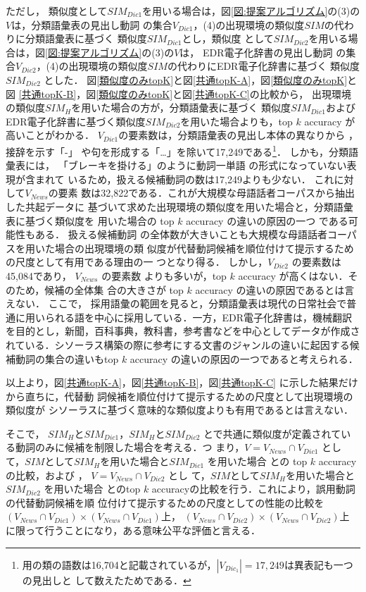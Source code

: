 \documentclass[japanese]{jnlp_1.4}
\begin{document}
ただし，
類似度として$SIM_{Dic1}$を用いる場合は，図\ref{図:提案アルゴリズム}の(3)の$V$は，分類語彙表の見出し動詞
の集合$V_{Dic1}$，(4)の出現環境の類似度$SIM$の代わりに分類語彙表に基づく
類似度$SIM_{Dic1}$とし，類似度
として$SIM_{Dic2}$を用いる場合は，図\ref{図:提案アルゴリズム}の(3)の$V$は，
EDR電子化辞書の見出し動詞
の集合$V_{Dic2}$，(4)の出現環境の類似度$SIM$の代わりにEDR電子化辞書に基づく
類似度$SIM_{Dic2}$
とした．
図\ref{類似度のみtopK}と図\ref{共通topK-A}，図\ref{類似度のみtopK}と図
\ref{共通topK-B}，図\ref{類似度のみtopK}と図\ref{共通topK-C}の比較から，
出現環境の類似度$SIM_{H}$を用いた場合の方が，分類語彙表に基づく
類似度$SIM_{Dic1}$およびEDR電子化辞書に基づく類似度$SIM_{Dic2}$を用いた場合よりも，top $k$
accuracy が高いことがわかる．
$V_{Dic1}$の要素数は，分類語彙表の見出し本体の異なりから
，接辞を示す「-」
 や句を形成する「…」を除いて17,249である\footnote{
用の類の語数は16,704と記載されているが，$|V_{Dic_1}|=17,249$は異表記も一つの見出しと
して数えたためである．
}．
しかも，分類語彙表には，
「ブレーキを掛ける」のように動詞一単語
の形式になっていない表現が含まれて
いるため，扱える候補動詞の数は17,249よりも少ない．
これに対して$V_{News}$の要素
数は32,822である．これが大規模な母語話者コーパスから抽出した共起データに
基づいて求めた出現環境の類似度を用いた場合と，分類語彙表に基づく類似度を
用いた場合の top $k$ accuracy の違いの原因の一つ
である可能性もある．
扱える候補動詞
の全体数が大きいことも大規模な母語話者コーパスを用いた場合の出現環境の類
似度が代替動詞候補を順位付けて提示するための尺度として有用である理由の一
つとなり得る．
しかし，$V_{Dic2}$ の要素数は45,084であり，
$V_{News}$
の要素数
よりも多いが，top $k$ accuracy が高くはない．そのため，候補の全体集
合の大きさが top $k$ accuracy の違いの原因であるとは言えない．
ここで，
採用語彙の範囲を見ると，分類語彙表は現代の日常社会で普通に用いられる語を中心に採用している．一方，EDR電子化辞書は，機械翻訳を目的とし，新聞，百科事典，教科書，参考書などを中心としてデータが作成されている．シソーラス構築の際に参考にする文書のジャンルの違いに起因する候補動詞の集合の違いもtop $k$ accuracy の違いの原因の一つであると考えられる．

以上より，図\ref {共通topK-A}，図\ref {共通topK-B}，図\ref {共通topK-C}
に示した結果だけから直ちに，代替動
詞候補を順位付けて提示するための尺度として出現環境の類似度が
シソーラスに基づく意味的な類似度よりも有用であるとは言えない．

そこで，
$SIM_{H}$と$SIM_{Dic1}$，$SIM_{H}$と$SIM_{Dic2}$
とで共通に類似度が定義されている動詞のみに候補を制限した場合を考える．つ
まり，$V = V_{News} \cap V_{Dic1}$ とし
て，$SIM$として$SIM_{H}$を用いた場合と$SIM_{Dic1}$ を用いた場合
との top $k$ accuracy の比較，および
，
$V = V_{News} \cap V_{Dic2}$ とし
て，$SIM$として$SIM_{H}$を用いた場合と$SIM_{Dic2}$ を用いた場合
とのtop $k$ accuracyの比較を行う．これにより，誤用動詞の代替動詞候補を順
位付けて提示するための尺度としての性能の比較を
$(V_{News} \cap V_{Dic1})\times(V_{News} \cap V_{Dic1})$上，
$(V_{News} \cap V_{Dic2})\times(V_{News} \cap V_{Dic2})$上
に限って行うことになり，ある意味公平な評価と言える．
\end{document}
